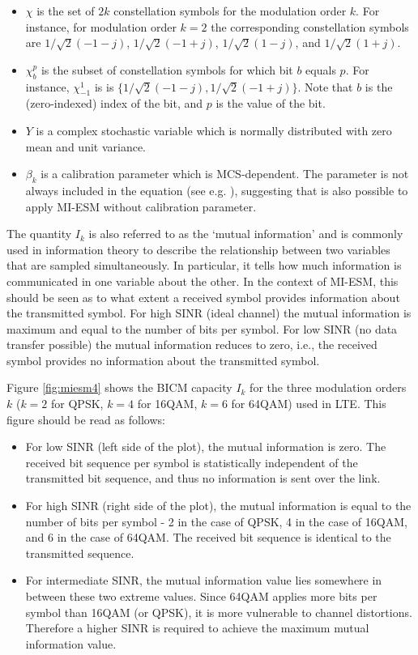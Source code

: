 \begin{itemize}
    \item $\chi$ is the set of $2k$ constellation symbols for the modulation order $k$. For instance, for modulation order $k = 2$ the corresponding constellation symbols are $1/\sqrt{2} (-1-j)$, $1/\sqrt{2} (-1+j)$, $1/\sqrt{2} (1-j)$, and $1/\sqrt{2} (1+j)$.
    \item $\chi^p_b$ is the subset of constellation symbols for which bit $b$ equals $p$. For instance, $\chi_{-1}^1$ is 
    is $\{1/\sqrt{2} (-1-j), 1/\sqrt{2} (-1+j)\}$. Note that $b$ is the (zero-indexed) index of the bit, and $p$ is the value of the bit.
    \item $Y$ is a complex stochastic variable which is normally distributed with zero mean and unit variance.
    \item $\beta_k$ is a calibration parameter which is MCS-dependent. The parameter is not always included in the equation (see e.g. \cite{miesm1}), suggesting that is also possible to apply MI-ESM without calibration parameter.
\end{itemize}


The quantity $I_k$ is also referred to as the `mutual information' and is commonly used in information theory to describe the relationship between two variables that are sampled simultaneously. In particular, it tells how much information is
communicated in one variable about the other. In the context of MI-ESM, this should be seen as to what extent a received symbol provides information about the transmitted symbol. For high SINR (ideal channel) the mutual information is
maximum and equal to the number of bits per symbol. For low SINR (no data transfer possible) the mutual information reduces to zero, i.e., the received symbol provides no information about the transmitted symbol. 

Figure \ref{fig:miesm4} shows the BICM capacity $I_k$ for the three modulation orders $k$ ($k = 2$ for QPSK, $k = 4$ for 16QAM, $k = 6$ for 64QAM) used in LTE. This figure should be read as follows:

\begin{itemize}
    \item For low SINR (left side of the plot), the mutual information is zero. The received bit sequence per symbol is statistically independent of the transmitted bit sequence, and thus no information is sent over the link.
    \item For high SINR (right side of the plot), the mutual information is equal to the number of bits per symbol - 2 in the case of QPSK, 4 in the case of 16QAM, and 6 in the case of 64QAM. The received bit sequence is identical to the transmitted sequence.
    \item For intermediate SINR, the mutual information value lies somewhere in between these two extreme values. Since 64QAM applies more bits per symbol than 16QAM (or QPSK), it is more vulnerable to channel distortions. Therefore a higher SINR is required to achieve the maximum mutual information value. 

\end{itemize}



